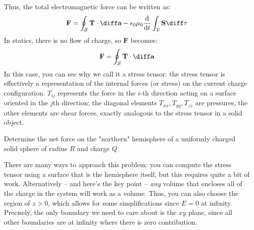 \documentclass[10pt]{article}
\begin{document}
	Thus, the total electromagnetic force can be written as:
	\[
		\mathbf{F} = \oint_{\mathcal{S}} \mathbf{T} \cdot \diff \mathbf{a} - \epsilon_0 \mu_0 \dv{t}
		\int_{\mathcal{V}}\mathbf{S} \diff \tau
	\]
	In statics, there is no flow of charge, so \( \mathbf{F} \) becomes:
	\[
		\mathbf{F} = \oint_{\mathcal{S}}\mathbf{T} \cdot \diff \mathbf{a}
	\]
	In this case, you can see why we call it a stress tensor: the stress tensor is effectively a
	representation of the internal forces (or stress) on the current charge configuration. \( T_{ij} \)
	represents the force in the \( i \)-th direction acting on a surface oriented in the \( j \)th direction;
	the diagonal elements \( T_{x x}, T_{yy}, T_{zz} \) are pressures, the other elements are shear forces,
	exactly analogous to the stress tensor in a solid object. 

	\begin{example}
		Determine the net force on the "northern" hemisphere of a uniformly charged solid sphere of radius \(
		R\) and charge \( Q \).

		\begin{solution}
			There are many ways to approach this problem: you can compute the stress tensor using a surface
			that is the hemisphere itself, but this requires quite a bit of work. Alternatively -- and here's
			the key point -- \textit{any} volume that encloses all of the charge in the system will work as a
			volume. Thus, you can also choose the region of \( z > 0 \), which allows for some
			simplifications since \( E = 0 \) at infinity. Precisely, the only boundary we need to care about
			is the \( xy \) plane, since all other boundaries are at infinity where there is zero
			contribution.


\end{solution}
\end{example}
\end{document}
